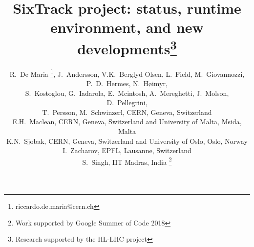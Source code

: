\documentclass[a4paper,
              ]{jacow}
\begin{document}
\title{SixTrack project: status, runtime environment, and new developments\thanks{Research supported by the HL-LHC project}}

\author{
R.~De Maria \thanks{riccardo.de.maria@cern.ch},
J.~Andersson,
V.K.~Berglyd Olsen,
L.~Field,
M.~Giovannozzi,
P.~D.~Hermes,
N.~H\o imyr, \\
S.~Kostoglou,
G.~Iadarola,
E.~Mcintosh,
A.~Mereghetti,
J.~Molson,
D.~Pellegrini,\\
T.~Persson,
M.~Schwinzerl,
CERN, Geneva, Switzerland \\
E.H.~Maclean, CERN, Geneva, Switzerland and University of Malta, Msida, Malta\\
K.N.~Sjobak, CERN, Geneva, Switzerland and University of Oslo, Oslo, Norway\\
I.~Zacharov, EPFL, Lausanne, Switzerland \\
S.~Singh, IIT Madras, India \thanks{Work supported by Google Summer of Code 2018}
}
\maketitle

\end{document}

